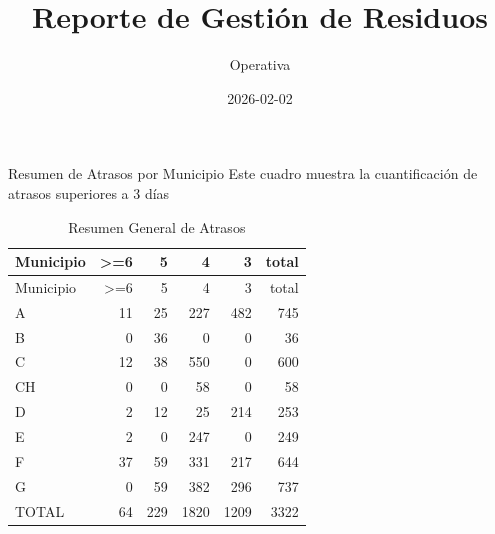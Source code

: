 \documentclass[
  letterpaper,
  DIV=11,
  numbers=noendperiod]{scrartcl}
\title{Reporte de Gestión de Residuos}
\author{Operativa}
\date{2026-02-02}
\renewcommand*\contentsname{Table of contents}
\newcommand\contentsname{Table of contents}
\begin{document}
\maketitle

\renewcommand*\contentsname{Table of contents}
{
\hypersetup{linkcolor=}
\setcounter{tocdepth}{3}
\tableofcontents
}

Resumen de Atrasos por Municipio Este cuadro muestra la cuantificación
de atrasos superiores a 3 días

\begin{longtable}[]{@{}lrrrrr@{}}
\caption{Resumen General de Atrasos}\tabularnewline
\toprule\noalign{}
Municipio & \textgreater=6 & 5 & 4 & 3 & total \\
\midrule\noalign{}
\endfirsthead
\toprule\noalign{}
Municipio & \textgreater=6 & 5 & 4 & 3 & total \\
\midrule\noalign{}
\endhead
\bottomrule\noalign{}
\endlastfoot
A & 11 & 25 & 227 & 482 & 745 \\
B & 0 & 36 & 0 & 0 & 36 \\
C & 12 & 38 & 550 & 0 & 600 \\
CH & 0 & 0 & 58 & 0 & 58 \\
D & 2 & 12 & 25 & 214 & 253 \\
E & 2 & 0 & 247 & 0 & 249 \\
F & 37 & 59 & 331 & 217 & 644 \\
G & 0 & 59 & 382 & 296 & 737 \\
TOTAL & 64 & 229 & 1820 & 1209 & 3322 \\
\end{longtable}
\end{document}
